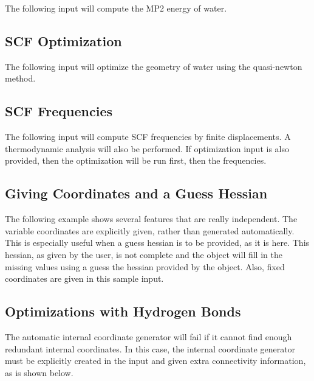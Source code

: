 The following input will compute the MP2 energy of water.



\subsection{SCF Optimization}

The following input will optimize the geometry of water using
the quasi-newton method.



\subsection{SCF Frequencies}

The following input will compute SCF frequencies by finite
displacements.  A thermodynamic analysis will also be
performed.  If optimization input is also provided, then the
optimization will be run first, then the frequencies.



\subsection{Giving Coordinates and a Guess Hessian}

The following example shows several features that are really independent.
The variable coordinates are explicitly given, rather than generated
automatically.  This is especially useful when a guess hessian is to be
provided, as it is here.  This hessian, as given by the user, is not
complete and the  object will fill in the missing
values using a guess the hessian provided by the 
object.  Also, fixed coordinates are given in this sample input.



\subsection{Optimizations with Hydrogen Bonds}

The automatic internal coordinate generator will fail if it cannot find
enough redundant internal coordinates.  In this case, the internal
coordinate generator must be explicitly created in the input and given
extra connectivity information, as is shown below.


